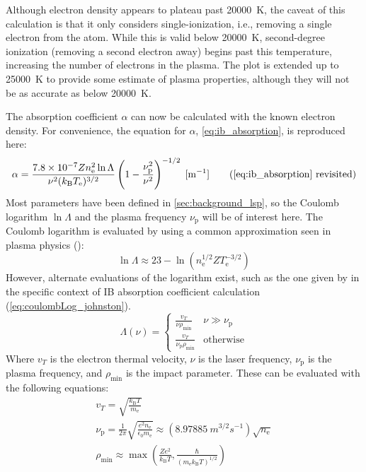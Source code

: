         Although electron density appears to plateau past \qty{20000}{K}, the caveat of this calculation is that it only considers single-ionization, i.e., removing a single electron from the atom. While this is valid below \qty{20000}{K}, second-degree ionization (removing a second electron away) begins past this temperature, increasing the number of electrons in the plasma. The plot is extended up to \qty{25000}{K} to provide some estimate of plasma properties, although they will not be as accurate as below \qty{20000}{K}.

        The absorption coefficient $\alpha$ can now be calculated with the known electron density. For convenience, the equation for $\alpha$, \autoref{eq:ib_absorption}, is reproduced here:
        \begin{equation*}
            \ibalphaeq \tag{\ref{eq:ib_absorption} revisited}
        \end{equation*}
        Most parameters have been defined in \autoref{sec:background_lsp}, so the Coulomb logarithm $\ln{\Lambda}$ and the plasma frequency $\nu_\mathrm{p}$ will be of interest here. The Coulomb logarithm is evaluated by \textcite{nassarInvestigationLasersustainedPlasma2012} using a common approximation seen in plasma physics (\textcite{richardson2019NRLPlasma2019}):
        \begin{equation}\label{eq:coulombLog_NRL}
            \ln{\Lambda} \approx 23-\ln{(n_\mathrm{e}^{1/2}ZT_\mathrm{e}^{-3/2})}
        \end{equation}
        However, alternate evaluations of the logarithm exist, such as the one given by \textcite{johnstonCorrectValuesHighfrequency1973} in the specific context of IB absorption coefficient calculation (\autoref{eq:coulombLog_johnston}). 
        \begin{equation} \label{eq:coulombLog_johnston}
            \Lambda(\nu) = \begin{cases}
                \frac{v_T}{\nu\rho_\mathrm{min}} & \nu \gg \nu_\mathrm{p}\\
                \frac{v_T}{\nu_\mathrm{p}\rho_\mathrm{min}} & \text{otherwise}
            \end{cases}
        \end{equation}
        Where $v_T$ is the electron thermal velocity, $\nu$ is the laser frequency, $\nu_\mathrm{p}$ is the plasma frequency, and $\rho_\mathrm{min}$ is the impact parameter. These can be evaluated with the following equations:
        \begin{gather}
            v_T = \sqrt{\frac{k_\mathrm{B}T}{m_\mathrm{e}}} \\
            \nu_\mathrm{p} = \frac{1}{2\pi}\sqrt{\frac{e^2n_\mathrm{e}}{\epsilon_0 m_\mathrm{e}}} \approx (\qty{8.97885}{m^{3/2}s^{-1}})\sqrt{n_\mathrm{e}}\\
            \rho_\mathrm{min} \approx \max{\left(\frac{Ze^2}{k_\mathrm{B}T}, \frac{\hbar}{(m_\mathrm{e}k_\mathrm{B}T)^{1/2}}\right)}
        \end{gather}
